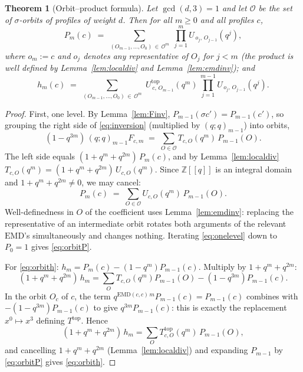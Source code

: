 \documentclass[11pt]{article}
\newtheorem{theorem}{Theorem}
\newcommand{\EMD}{\mathrm{EMD}}
\begin{document}
\begin{theorem}[Orbit--product formula]\label{thm:orbit}
Let $\gcd(d,3)=1$ and let $\mathcal{O}$ be the set of $\sigma$-orbits of profiles of weight
$d$. Then for all $m\ge 0$ and all profiles $c$,
\begin{equation}\label{eq:orbitP}
P_m(c) \;=\; \sum_{(O_{m-1},\dots,O_0)\,\in\,\mathcal{O}^m}\;
\prod_{j=1}^{m} U_{\,o_j,\,O_{j-1}}(q^j),
\end{equation}
where $o_m := c$ and $o_j$ denotes any representative of $O_j$ for $j<m$ (the product is
well defined by Lemma~\ref{lem:localdiv} and Lemma~\ref{lem:emdinv}); and
\begin{equation}\label{eq:orbith}
h_m(c) \;=\; \sum_{(O_{m-1},\dots,O_0)\,\in\,\mathcal{O}^m}\;
U^{\mathrm{top}}_{\,c,\,O_{m-1}}(q^m)\,
\prod_{j=1}^{m-1} U_{\,o_j,\,O_{j-1}}(q^j).
\end{equation}
\end{theorem}

\begin{proof}
First, one level. By Lemma~\ref{lem:Finv}, $P_{m-1}(\sigma c')=P_{m-1}(c')$, so grouping the
right side of \eqref{eq:inversion} (multiplied by $(q;q)_{m-1}$) into orbits,
\[
(1-q^{3m})\,(q;q)_{m-1} F_{c,m} \;=\; \sum_{O\in\mathcal{O}} T_{c,O}(q^m)\, P_{m-1}(O).
\]
The left side equals $(1+q^m+q^{2m})\,P_m(c)$, and by Lemma~\ref{lem:localdiv}
$T_{c,O}(q^m) = (1+q^m+q^{2m})\,U_{c,O}(q^m)$. Since $\mathbb{Z}[[q]]$ is an integral domain
and $1+q^m+q^{2m}\neq 0$, we may cancel:
\begin{equation}\label{eq:onelevel}
P_m(c) \;=\; \sum_{O\in\mathcal{O}} U_{c,O}(q^m)\, P_{m-1}(O).
\end{equation}
Well-definedness in $O$ of the coefficient uses Lemma~\ref{lem:emdinv}: replacing the
representative of an intermediate orbit rotates both arguments of the relevant $\EMD$'s
simultaneously and changes nothing. Iterating \eqref{eq:onelevel} down to $P_0=1$ gives
\eqref{eq:orbitP}.

For \eqref{eq:orbith}: $h_m = P_m(c) - (1-q^m)P_{m-1}(c)$. Multiply by $1+q^m+q^{2m}$:
\[
(1+q^m+q^{2m})\,h_m = \sum_{O} T_{c,O}(q^m) P_{m-1}(O) - (1-q^{3m}) P_{m-1}(c).
\]
In the orbit $O_c$ of $c$, the term $q^{\EMD(c,c)\,m}P_{m-1}(c) = P_{m-1}(c)$ combines with
$-(1-q^{3m})P_{m-1}(c)$ to give $q^{3m}P_{m-1}(c)$: this is exactly the replacement
$x^0 \mapsto x^3$ defining $T^{\mathrm{top}}$. Hence
\[
(1+q^m+q^{2m})\,h_m = \sum_{O} T^{\mathrm{top}}_{c,O}(q^m)\, P_{m-1}(O),
\]
and cancelling $1+q^m+q^{2m}$ (Lemma~\ref{lem:localdiv}) and expanding $P_{m-1}$ by
\eqref{eq:orbitP} gives \eqref{eq:orbith}.
\end{proof}
\end{document}
